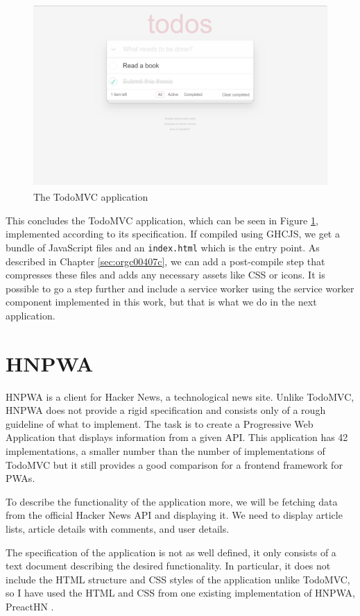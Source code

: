\documentclass[english,zadani,odsaz]{fitthesis}
\begin{document}
\begin{figure}[!t]
\centering
\includegraphics[height=7cm]{obrazky-figures/screenshot-todomvc.png}
\caption{The TodoMVC application \label{todomvc-app}}
\end{figure}

This concludes the TodoMVC application, which can be seen in Figure
\ref{todomvc-app}, implemented according to its specification. If compiled using
GHCJS, we get a bundle of JavaScript files and an \texttt{index.html} which is the entry
point. As described in Chapter \ref{sec:orgc00407c}, we can add a post-compile step that
compresses these files and adds any necessary assets like CSS or icons. It is
possible to go a step further and include a service worker using the service
worker component implemented in this work, but that is what we do in the next
application.

\section{HNPWA}
\label{sec:org262ed81}
HNPWA \cite{hnpwa} is a client for Hacker News, a technological news site. Unlike
TodoMVC, HNPWA does not provide a rigid specification and consists only of a
rough guideline of what to implement. The task is to create a Progressive Web
Application that displays information from a given API. This application has 42
implementations, a smaller number than the number of implementations of TodoMVC
but it still provides a good comparison for a frontend framework for PWAs.

To describe the functionality of the application more, we will be fetching data
from the official Hacker News API and displaying it. We need to display article
lists, article details with comments, and user details.

The specification of the application is not as well defined, it only consists of
a text document describing the desired functionality. In particular, it does not
include the HTML structure and CSS styles of the application unlike TodoMVC, so
I have used the HTML and CSS from one existing implementation of HNPWA, PreactHN
\cite{preacthn}.
\end{document}
